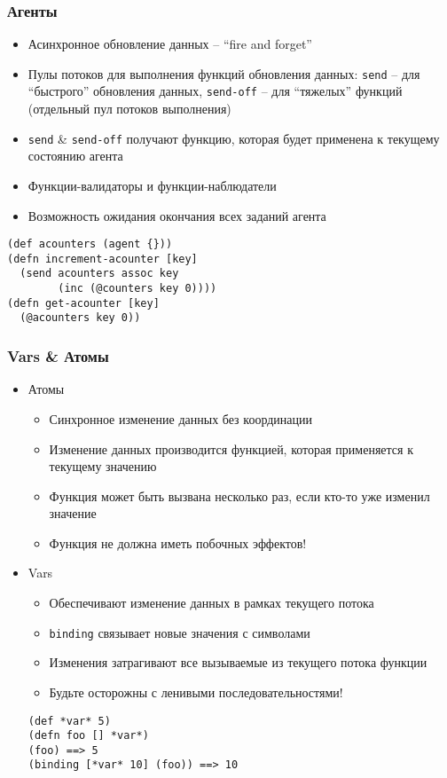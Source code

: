 \documentclass[ignorenonframetext]{beamer}
\begin{document}
\begin{frame}[fragile,t]
  \frametitle{Агенты}
  \begin{itemize}
  \item Асинхронное обновление данных -- ``fire and forget''
  \item Пулы потоков для выполнения функций обновления данных: \texttt{send} -- для
    ``быстрого'' обновления данных, \texttt{send-off} -- для ``тяжелых'' функций
    (отдельный пул потоков выполнения)
  \item \texttt{send} \& \texttt{send-off} получают функцию, которая будет применена к
    текущему состоянию агента
  \item Функции-валидаторы и функции-наблюдатели
  \item Возможность ожидания окончания всех заданий агента
  \end{itemize}
\begin{lstlisting}
(def acounters (agent {}))
(defn increment-acounter [key]
  (send acounters assoc key 
        (inc (@counters key 0))))
(defn get-acounter [key]
  (@acounters key 0))
\end{lstlisting}
\end{frame}

\begin{frame}[t,fragile]
  \frametitle{Vars \& Атомы}
  \begin{itemize}
  \item Атомы
    \begin{itemize}
    \item Синхронное изменение данных без координации
    \item Изменение данных производится функцией, которая применяется к текущему значению
    \item Функция может быть вызвана несколько раз, если кто-то уже изменил значение
    \item Функция не должна иметь побочных эффектов!
    \end{itemize}
  \item Vars
    \begin{itemize}
    \item Обеспечивают изменение данных в рамках текущего потока
    \item \texttt{binding} связывает новые значения с символами
    \item Изменения затрагивают все вызываемые из текущего потока функции
    \item Будьте осторожны с ленивыми последовательностями!
    \end{itemize}
\begin{lstlisting}
(def *var* 5)
(defn foo [] *var*)
(foo) ==> 5
(binding [*var* 10] (foo)) ==> 10
\end{lstlisting}
  \end{itemize}
\end{frame}
\end{document}
